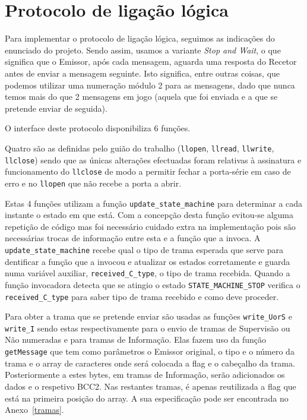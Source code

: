 \documentclass[11pt,a4paper,reqno]{report}
\numberwithin{equation}{section}
\begin{document}
\chapter{Protocolo de ligação lógica}

Para implementar o protocolo de ligação lógica, seguimos as indicações do enunciado do projeto. Sendo assim, usamos a variante \emph{Stop and Wait}, o que significa que o Emissor, após cada mensagem, aguarda uma resposta do Recetor antes de enviar a mensagem seguinte. Isto significa, entre outras coisas, que podemos utilizar uma numeração módulo 2 para as mensagens, dado que nunca temos mais do que 2 mensagens em jogo (aquela que foi enviada e a que se pretende enviar de seguida).

O interface deste protocolo disponibiliza 6 funções. 

Quatro são as definidas pelo guião do trabalho (\verb|llopen|, \verb|llread|, \verb|llwrite|, \verb|llclose|) sendo que as únicas alterações efectuadas foram relativas à assinatura e funcionamento do \verb|llclose| de modo a permitir fechar a porta-série em caso de erro e no \verb|llopen|  que não recebe a porta a abrir. 

Estas 4 funções utilizam a função \verb|update_state_machine| para determinar a cada instante o estado em que está.
Com a concepção desta função evitou-se alguma repetição de código mas foi necessário cuidado extra na implementação pois são necessárias trocas de informação entre esta e a função que a invoca. A \verb|update_state_machine| recebe qual o tipo de trama esperada que serve para dentificar a função que a invocou e atualizar os estados corretamente e guarda numa variável auxiliar, \verb|received_C_type|, o tipo de trama recebida. Quando a função invocadora detecta que se atingio o estado \verb|STATE_MACHINE_STOP| verifica o \verb|received_C_type| para saber  tipo de trama recebido e como deve proceder.

Para obter a trama que se pretende enviar são usadas as funções \verb|write_UorS| e \verb|write_I| sendo estas respectivamente para o envio de tramas de Supervisão ou Não numeradas e para tramas de Informação. Elas fazem uso da função \verb|getMessage| que tem como parâmetros o Emissor original, o tipo e o número da trama e o array de caracteres onde será colocada a flag e o cabeçalho da trama. Posteriormente a estes bytes, em tramas de Informação, serão adicionados os dados e o respetivo BCC2. Nas restantes tramas, é apenas reutilizada a flag que está na primeira posição do array. A sua especificação pode ser encontrada no Anexo~\ref{tramas}.
\end{document}
